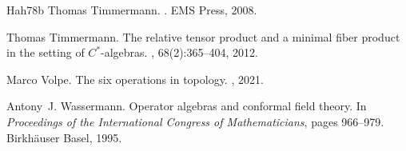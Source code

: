 \documentclass[10pt,a4paper,oneside]{amsart}
\theoremstyle{remark}
\theoremstyle{definition}
\begin{document}
\begin{thebibliography}{Hah78b}
	Thomas Timmermann.
	.
	\newblock EMS Press, 2008.
	
	Thomas Timmermann.
	\newblock The relative tensor product and a minimal fiber product in the
	setting of {$C^*$}-algebras.
	, 68(2):365--404, 2012.
	
	Marco Volpe.
	\newblock The six operations in topology.
	, 2021.
	
	Antony~J. Wassermann.
	\newblock Operator algebras and conformal field theory.
	\newblock In {\em Proceedings of the International Congress of Mathematicians},
	pages 966--979. Birkhäuser Basel, 1995.
	
\end{thebibliography}
\end{document}
